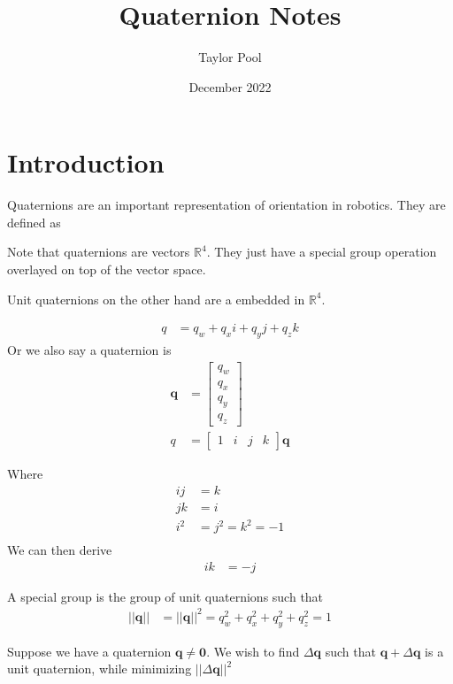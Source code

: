 \documentclass{article}
\title{Quaternion Notes}
\author{Taylor Pool}
\date{December 2022}
\begin{document}
\maketitle

\section{Introduction}

Quaternions are an important representation of orientation in robotics. They are defined as 

Note that quaternions are vectors $\mathbb{R}^4$. They just have a special group operation overlayed on top of the vector space.

Unit quaternions on the other hand are a  embedded in $\mathbb{R}^4$.

\begin{align*}
    q &= q_w + q_x i + q_y j + q_z k
\end{align*}
Or we also say a quaternion is
\begin{align*}
    \pmb{q} &= \begin{bmatrix}
        q_w \\
        q_x \\
        q_y \\
        q_z
    \end{bmatrix} \\
    q &= \begin{bmatrix}
        1 & i & j & k
    \end{bmatrix} \pmb{q}
\end{align*}

Where
\begin{align*}
    ij &= k \\
    jk &= i \\
    i^2 &= j^2 = k^2 = -1 \\
\end{align*}
We can then derive
\begin{align*}
    ik &= -j
\end{align*}

A special group is the group of unit quaternions such that
\begin{align*}
    || \pmb{q} || &= || \pmb{q} ||^2 = q_w^2 + q_x^2 + q_y^2 + q_z^2 = 1
\end{align*}

Suppose we have a quaternion $\pmb{q} \ne \pmb{0}$. We wish to find $\Delta \pmb{q}$ such that $\pmb{q} + \Delta \pmb{q} $ is a unit quaternion, while minimizing $||\Delta \pmb{q}||^2$
\end{document}
